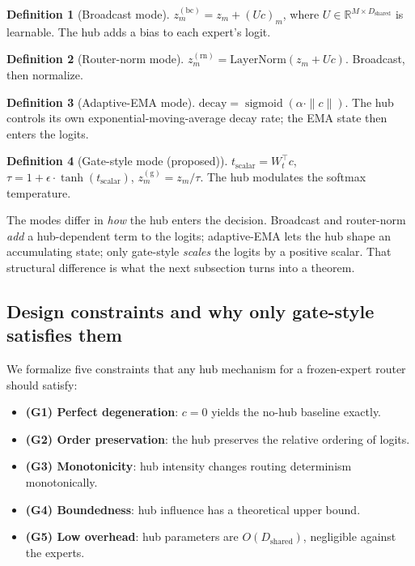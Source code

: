 \documentclass[10pt]{article}
\newcommand{\sigmoid}{\operatorname{sigmoid}}
\newcommand{\R}{\mathbb{R}}
\theoremstyle{definition}
\newtheorem{definition}{Definition}[section]
\theoremstyle{plain}
\theoremstyle{remark}
\begin{document}
\begin{definition}[Broadcast mode]
$z_m^{(\text{bc})} = z_m + (U c)_m$, where $U \in \R^{M \times D_{\text{shared}}}$ is learnable. The hub adds a bias to each expert's logit.
\end{definition}

\begin{definition}[Router-norm mode]
$z_m^{(\text{rn})} = \mathrm{LayerNorm}(z_m + U c)$. Broadcast, then normalize.
\end{definition}

\begin{definition}[Adaptive-EMA mode]
$\text{decay} = \sigmoid(\alpha \cdot \|c\|)$. The hub controls its own exponential-moving-average decay rate; the EMA state then enters the logits.
\end{definition}

\begin{definition}[Gate-style mode (proposed)]
$t_{\text{scalar}} = W_t^\top c$, $\tau = 1 + \epsilon \cdot \tanh(t_{\text{scalar}})$, $z_m^{(\text{g})} = z_m / \tau$. The hub modulates the softmax temperature.
\end{definition}

The modes differ in \emph{how} the hub enters the decision. Broadcast and router-norm \emph{add} a hub-dependent term to the logits; adaptive-EMA lets the hub shape an accumulating state; only gate-style \emph{scales} the logits by a positive scalar. That structural difference is what the next subsection turns into a theorem.

\subsection{Design constraints and why only gate-style satisfies them}
\label{sec:theory}

We formalize five constraints that any hub mechanism for a frozen-expert router should satisfy:
\begin{itemize}[leftmargin=1.5em, itemsep=1pt]
    \item \textbf{(G1) Perfect degeneration}: $c=0$ yields the no-hub baseline exactly.
    \item \textbf{(G2) Order preservation}: the hub preserves the relative ordering of logits.
    \item \textbf{(G3) Monotonicity}: hub intensity changes routing determinism monotonically.
    \item \textbf{(G4) Boundedness}: hub influence has a theoretical upper bound.
    \item \textbf{(G5) Low overhead}: hub parameters are $O(D_{\text{shared}})$, negligible against the experts.
\end{itemize}
\end{document}
